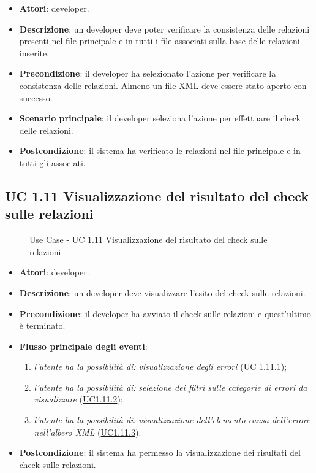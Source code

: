		\begin{itemize}
			\item\textbf{Attori}: developer.
			\item\textbf{Descrizione}: un developer deve poter verificare la consistenza delle relazioni presenti nel file principale e in tutti i file associati sulla base delle relazioni inserite.
			\item\textbf{Precondizione}: il developer ha selezionato l'azione per verificare la consistenza delle relazioni. Almeno un file XML deve essere stato aperto con successo.
			\item\textbf{Scenario principale}: il developer seleziona l'azione per effettuare il check delle relazioni.
			\item\textbf{Postcondizione}: il sistema ha verificato le relazioni nel file principale e in tutti gli associati.
		\end{itemize}
		
	\subsection{UC 1.11 Visualizzazione del risultato del check sulle relazioni}
		\label{subsec:XEUC1.11}
		
		\begin{figure}[!h] 
			\centering 
			\caption{Use Case - UC 1.11 Visualizzazione del risultato del check sulle relazioni}
		\end{figure}
		
		\begin{itemize}
			\item\textbf{Attori}: developer.
			\item\textbf{Descrizione}: un developer deve visualizzare l'esito del check sulle relazioni.
			\item\textbf{Precondizione}: il developer ha avviato il check sulle relazioni e quest'ultimo è terminato.
			\item\textbf{Flusso principale degli eventi}: 
			\begin{enumerate}
				\item \textit{l'utente ha la possibilità di:} \textit{visualizzazione degli errori} (\hyperref[subsec:XEUC1.11.1]{UC 1.11.1});
				
				\item \textit{l'utente ha la possibilità di:} \textit{selezione dei filtri sulle categorie di errori da visualizzare} (\hyperref[subsec:XEUC1.11.2]{UC1.11.2});
				
				\item \textit{l'utente ha la possibilità di:} \textit{visualizzazione dell'elemento causa dell'errore nell'albero XML} (\hyperref[subsec:XEUC1.11.3]{UC1.11.3}).
				
			\end{enumerate}
			\item\textbf{Postcondizione}: il sistema ha permesso la visualizzazione dei risultati del check sulle relazioni.
		\end{itemize}
		
